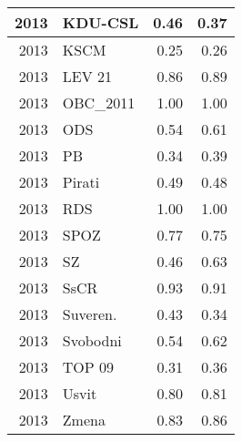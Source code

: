 \begin{tabular}{r|l|r|r}
\hline
2013 & KDU-CSL & 0.46 & 0.37\\
\hline
2013 & KSCM & 0.25 & 0.26\\
\hline
2013 & LEV 21 & 0.86 & 0.89\\
\hline
2013 & OBC\_2011 & 1.00 & 1.00\\
\hline
2013 & ODS & 0.54 & 0.61\\
\hline
2013 & PB & 0.34 & 0.39\\
\hline
2013 & Pirati & 0.49 & 0.48\\
\hline
2013 & RDS & 1.00 & 1.00\\
\hline
2013 & SPOZ & 0.77 & 0.75\\
\hline
2013 & SZ & 0.46 & 0.63\\
\hline
2013 & SsCR & 0.93 & 0.91\\
\hline
2013 & Suveren. & 0.43 & 0.34\\
\hline
2013 & Svobodni & 0.54 & 0.62\\
\hline
2013 & TOP 09 & 0.31 & 0.36\\
\hline
2013 & Usvit & 0.80 & 0.81\\
\hline
2013 & Zmena & 0.83 & 0.86\\
\hline
\end{tabular}
